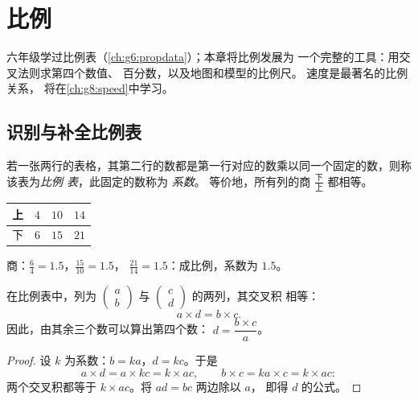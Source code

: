 \chapter{比例}\label{ch:g7:prop}

六年级学过比例表（\cref{ch:g6:propdata}）；本章将比例发展为
一个完整的工具：用交叉法则求第四个数值、
百分数，以及地图和模型的比例尺。
速度是最著名的比例关系，
将在\cref{ch:g8:speed}中学习。

\section{识别与补全比例表}

\begin{definition}[比例表]\label{def:g7:prop:table}
若一张两行的表格，其第二行的数都是第一行对应的数乘以同一个固定的数，则称该表为\emph{比例
表}，此固定的数称为
\emph{系数}。
等价地，所有列的商
$\frac{\text{下}}{\text{上}}$ 都相等。
\end{definition}

\begin{example}\label{ex:g7:prop:recognize}
\begin{center}
\renewcommand{\arraystretch}{1.3}
\begin{tabular}{l|ccc}
上 & $4$ & $10$ & $14$ \\
\hline
下 & $6$ & $15$ & $21$ \\
\end{tabular}
\end{center}
商：$\frac64 = 1.5$，$\frac{15}{10} = 1.5$，
$\frac{21}{14} = 1.5$：成比例，系数为 $1.5$。
\end{example}

\begin{theorem}[交叉法则]\label{thm:g7:prop:cross}
在比例表中，列为 $\begin{pmatrix} a \\ b
\end{pmatrix}$ 与 $\begin{pmatrix} c \\ d \end{pmatrix}$ 的两列，其交叉积
相等：
\[
a \times d = b \times c .
\]
因此，由其余三个数可以算出第四个数：
$d = \dfrac{b \times c}{a}$。
\end{theorem}

\begin{proof}
设 $k$ 为系数：$b = ka$，$d = kc$。于是
\[
a \times d = a \times kc = k \times ac,
\qquad
b \times c = ka \times c = k \times ac :
\]
两个交叉积都等于 $k \times ac$。将 $ad = bc$ 两边除以 $a$，
即得 $d$ 的公式。
\end{proof}

